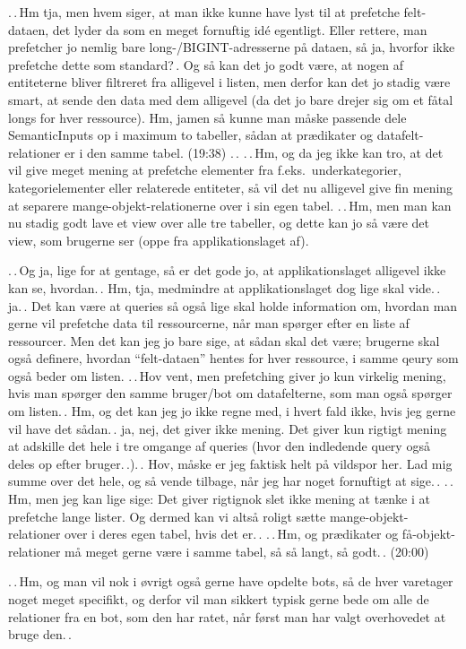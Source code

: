 \documentclass{report}
\begin{document}
.\,.\,Hm tja, men hvem siger, at man ikke kunne have lyst til at prefetche felt-dataen, det lyder da som en meget fornuftig idé egentligt. Eller rettere, man prefetcher jo nemlig bare long-/BIGINT-adresserne på dataen, så ja, hvorfor ikke prefetche dette som standard?\,. Og så kan det jo godt være, at nogen af entiteterne bliver filtreret fra alligevel i listen, men derfor kan det jo stadig være smart, at sende den data med dem alligevel (da det jo bare drejer sig om et fåtal longs for hver ressource). Hm, jamen så kunne man måske passende dele SemanticInputs op i maximum to tabeller, sådan at prædikater og datafelt-relationer er i den samme tabel. (19:38) .\,. .\,.\,Hm, og da jeg ikke kan tro, at det vil give meget mening at prefetche elementer fra f.eks.\ underkategorier, kategorielementer eller relaterede entiteter, så vil det nu alligevel give fin mening at separere mange-objekt-relationerne over i sin egen tabel. .\,.\,Hm, men man kan nu stadig godt lave et view over alle tre tabeller, og dette kan jo så være det view, som brugerne ser (oppe fra applikationslaget af). 

.\,.\,Og ja, lige for at gentage, så er det gode jo, at applikationslaget alligevel ikke kan se, hvordan.\,. Hm, tja, medmindre at applikationslaget dog lige skal vide.\,. ja.\,. Det kan være at queries så også lige skal holde information om, hvordan man gerne vil prefetche data til ressourcerne, når man spørger efter en liste af ressourcer. Men det kan jeg jo bare sige, at sådan skal det være; brugerne skal også definere, hvordan ``felt-dataen'' hentes for hver ressource, i samme qeury som også beder om listen. .\,.\,Hov vent, men prefetching giver jo kun virkelig mening, hvis man spørger den samme bruger/bot om datafelterne, som man også spørger om listen.\,. Hm, og det kan jeg jo ikke regne med, i hvert fald ikke, hvis jeg gerne vil have det sådan.\,. ja, nej, det giver ikke mening. Det giver kun rigtigt mening at adskille det hele i tre omgange af queries (hvor den indledende query også deles op efter bruger.\,.).\,. Hov, måske er jeg faktisk helt på vildspor her. Lad mig summe over det hele, og så vende tilbage, når jeg har noget fornuftigt at sige.\,. .\,.\,Hm, men jeg kan lige sige: Det giver rigtignok slet ikke mening at tænke i at prefetche lange lister. Og dermed kan vi altså roligt sætte mange-objekt-relationer over i deres egen tabel, hvis det er.\,. .\,.\,Hm, og prædikater og få-objekt-relationer må meget gerne være i samme tabel, så så langt, så godt.\,. (20:00) 

.\,.\,Hm, og man vil nok i øvrigt også gerne have opdelte bots, så de hver varetager noget meget specifikt, og derfor vil man sikkert typisk gerne bede om alle de relationer fra en bot, som den har ratet, når først man har valgt overhovedet at bruge den.\,. 
\end{document}
